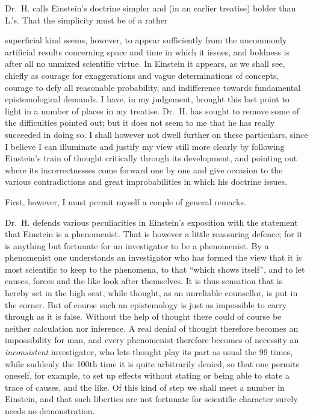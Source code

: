 \documentclass[12pt,a4paper]{article}
\begin{document}
Dr.\ H. calls Einstein's doctrine simpler and (in an earlier treatise) bolder
than L.'s. That the simplicity must be of a rather

superficial kind seems, however, to appear sufficiently from the uncommonly
artificial results concerning space and time in which it issues, and boldness
is after all no unmixed scientific virtue. In Einstein it appears, as we shall
see, chiefly as courage for exaggerations and vague determinations of
concepts, courage to defy all reasonable probability, and indifference towards
fundamental epistemological demands. I have, in my judgement, brought this
last point to light in a number of places in my treatise. Dr.\ H. has sought
to remove some of the difficulties pointed out; but it does not seem to me
that he has really succeeded in doing so. I shall however not dwell further on
these particulars, since I believe I can illuminate and justify my view still
more clearly by following Einstein's train of thought critically through its
development, and pointing out where its incorrectnesses come forward one by
one and give occasion to the various contradictions and great improbabilities
in which his doctrine issues.

First, however, I must permit myself a couple of general remarks.

Dr.\ H. defends various peculiarities in Einstein's exposition with the
statement that Einstein is a phenomenist. That is however a little reassuring
defence; for it is anything but fortunate for an investigator to be a
phenomenist. By a phenomenist one understands an investigator who has formed
the view that it is most scientific to keep to the phenomena, to that ``which
shows itself'', and to let causes, forces and the like look after themselves.
It is thus sensation that is hereby set in the high seat, while thought, as an
unreliable counsellor, is put in the corner. But of course such an
epistemology is just as impossible to carry through as it is false. Without
the help of thought there could of course be neither calculation nor
inference. A real denial of thought therefore becomes an impossibility for
man, and every phenomenist therefore becomes of necessity an
\emph{inconsistent} investigator, who lets thought play its part as usual the
99 times, while suddenly the 100th time it is quite arbitrarily denied, so
that one permits oneself, for example, to set up effects without stating or
being able to state a trace of causes, and the like. Of this kind of step we
shall meet a number in Einstein, and that such liberties are not fortunate for
scientific character surely needs no demonstration.
\end{document}
